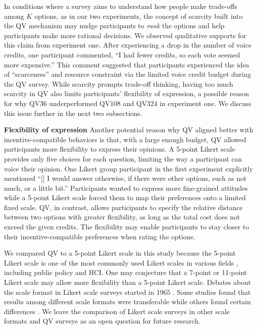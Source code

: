 In conditions where a survey aims to understand how people make trade-offs among $K$ options, as in our two experiments, the concept of scarcity built into the QV mechanism may nudge participants to \textit{rank} the options and help participants make more rational decisions. We observed qualitative supports for this claim from experiment one. After experiencing a drop in the number of voice credits, one participant commented, ``I had fewer credits, so each vote seemed more expensive.'' This comment suggested that participants experienced the idea of ``scarceness'' and resource constraint via the limited voice credit budget during the QV survey. While scarcity prompts trade-off thinking, having too much scarcity in QV also limits participants' flexibility of expression, a possible reason for why QV36 underperformed QV108 and QV324 in experiment one. We discuss this issue further in the next two subsections.

\textbf{Flexibility of expression}
Another potential reason why QV aligned better with incentive-compatible behaviors is that, with a large enough budget, QV allowed participants more flexibility to express their opinions. A 5-point Likert scale provides only five choices for each question, limiting the way a participant can voice their opinion. One Likert group participant in the first experiment explicitly mentioned ``[\textellipsis] I would answer otherwise, if there were other options, such as not much, or a little bit.'' Participants wanted to express more fine-grained attitudes while a 5-point Likert scale forced them to map their preferences onto a limited fixed scale. QV, in contrast, allows participants to specify the relative distance between two options with greater flexibility, as long as the total cost does not exceed the given credits. The flexibility may enable participants to stay closer to their incentive-compatible preferences when rating the options.

We compared QV to a 5-point Likert scale in this study because the 5-point Likert scale is one of the most commonly used Likert scales in various fields \cite{malhotra2006basic}, including public policy and HCI. One may conjecture that a 7-point or 11-point Likert scale may allow more flexibility than a 5-point Likert scale. Debates about the scale format in Likert scale surveys started in 1965 \cite{komorita1965number}. Some studies found that results among different scale formats were transferable while others found certain differences \cite{dawes2008data}. We leave the comparison of Likert scale surveys in other scale formats and QV surveys as an open question for future research.

